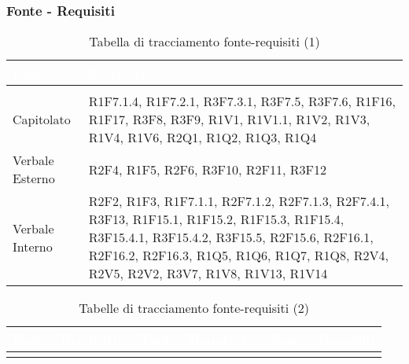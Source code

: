 \subsubsection{Fonte - Requisiti}
\renewcommand{\arraystretch}{1.5}
{
\setlength\arrayrulewidth{1pt}
\begin{longtable}{C{3cm} | C{12cm}}
		\textcolor{white}{\textbf{Fonte}} & 
		\textcolor{white}{\textbf{Requisiti}}\\
		\endfirsthead
	    \\
	    \endfoot
	    \caption{Tabella di tracciamento fonte-requisiti (1)}
	    \endlastfoot


Capitolato &  	R1F7.1.4, R1F7.2.1, R3F7.3.1, R3F7.5, R3F7.6, R1F16, R1F17, R3F8, R3F9, R1V1, R1V1.1, R1V2, R1V3, R1V4, R1V6, R2Q1, R1Q2, R1Q3, R1Q4 \\

Verbale Esterno & R2F4, R1F5, R2F6, R3F10, R2F11, R3F12 \\

Verbale Interno & 	R2F2, R1F3, R1F7.1.1, R2F7.1.2, R2F7.1.3, R2F7.4.1, R3F13, R1F15.1, R1F15.2, R1F15.3, R1F15.4, R3F15.4.1, R3F15.4.2, R3F15.5, R2F15.6, R2F16.1, R2F16.2, R2F16.3, R1Q5, R1Q6, R1Q7, R1Q8, R2V4, R2V5, R2V2, R3V7, R1V8, R1V13, R1V14 \\

\end{longtable}

\begin{longtable}{C{2cm} | C{2cm} C{0.5cm} C{2cm} | C{2cm} C{0.5cm} C{2cm} C{2cm}}
		\textcolor{white}{\textbf{Fonte}} & 
		\textcolor{white}{\textbf{Requisiti}} &
		 &
		\textcolor{white}{\textbf{Fonte}} & 
		\textcolor{white}{\textbf{Requisiti}} &
		 &
		\textcolor{white}{\textbf{Fonte}} & 
		\textcolor{white}{\textbf{Requisiti}} \\
		\endfirsthead
	    
	    \endfoot
	    \caption{Tabelle di tracciamento fonte-requisiti (2)}
	    \endlastfoot



\end{longtable}}
